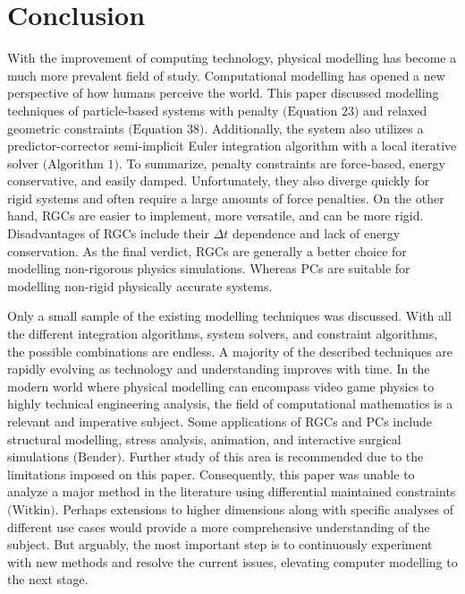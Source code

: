 \documentclass[12pt, letterpaper]{article}
\begin{document}
\section{Conclusion}
\hspace{\parindent}With the improvement of computing technology, physical modelling has become a much more prevalent field of study. Computational modelling has opened a new perspective of how humans perceive the world. This paper discussed modelling techniques of particle-based systems with penalty $\text{(Equation 23)}$ and relaxed geometric constraints $\text{(Equation 38)}$. Additionally, the system also utilizes a predictor-corrector semi-implicit Euler integration algorithm with a local iterative solver $\text{(Algorithm 1)}$. To summarize, penalty constraints are force-based, energy conservative, and easily damped. Unfortunately, they also diverge quickly for rigid systems and often require a large amounts of force penalties. On the other hand, RGCs are easier to implement, more versatile, and can be more rigid. Disadvantages of RGCs include their $\Delta t$ dependence and lack of energy conservation. As the final verdict, RGCs are generally a better choice for modelling non-rigorous physics simulations. Whereas PCs are suitable for modelling non-rigid physically accurate systems. 

Only a small sample of the existing modelling techniques was discussed. With all the different integration algorithms, system solvers, and constraint algorithms, the possible combinations are endless. A majority of the described techniques are rapidly evolving as technology and understanding improves with time. In the modern world where physical modelling can encompass video game physics to highly technical engineering analysis, the field of computational mathematics is a relevant and imperative subject. Some applications of RGCs and PCs include structural modelling, stress analysis, animation, and interactive surgical simulations $\text{(Bender)}$. Further study of this area is recommended due to the limitations imposed on this paper. Consequently, this paper was unable to analyze a major method in the literature using differential maintained constraints $\text{(Witkin)}$. Perhaps extensions to higher dimensions along with specific analyses of different use cases would  provide a more comprehensive understanding of the subject. But arguably, the most important step is to continuously experiment with new methods and resolve the current issues, elevating computer modelling to the next stage.
\clearpage
\end{document}
